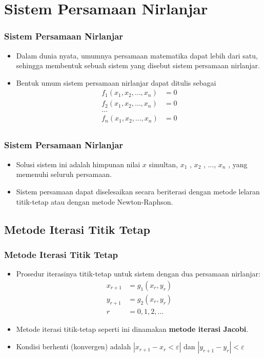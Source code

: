 \documentclass[pdflatex,compress]{beamer}
\begin{document}
\section{Sistem Persamaan Nirlanjar}

\begin{frame}
	\frametitle{Sistem Persamaan Nirlanjar}
	\begin{itemize}
		\item Dalam dunia nyata, umumnya persamaan matematika dapat lebih dari satu, sehingga membentuk sebuah sistem yang disebut sistem persamaan nirlanjar.
		\item Bentuk umum sistem persamaan nirlanjar dapat ditulis
		sebagai
		\begin{align*}
			f_1(x_1,x_2,\dots,x_n) &= 0 \\
			f_2(x_1,x_2,\dots,x_n) &= 0 \\
			\dots \\
			f_n(x_1,x_2,\dots,x_n) &= 0 \\
		\end{align*}
	\end{itemize}
\end{frame}

\begin{frame}
	\frametitle{Sistem Persamaan Nirlanjar}
	\begin{itemize}
		\item Solusi sistem ini adalah himpunan nilai $ x $ simultan, $ x_1 $ , $ x_2 $ , $\dots$, $ x_n $ , yang memenuhi seluruh persamaan.
		\item Sistem persamaan dapat diselesaikan secara beriterasi dengan metode lelaran titik-tetap atau dengan metode Newton-Raphson.
	\end{itemize}
\end{frame}

\subsection{Metode Iterasi Titik Tetap}

\begin{frame}
	\frametitle{Metode Iterasi Titik Tetap}
	\begin{itemize}
		\item Prosedur iterasinya titik-tetap untuk sistem dengan dua persamaan nirlanjar:
		\begin{align*}
			x_{r+1} &= g_1(x_r,y_r) \\
			y_{r+1} &= g_2(x_r,y_r) \\
			r &= 0,1,2,\dots
		\end{align*}
		\item Metode iterasi titik-tetap seperti ini dinamakan \textbf{metode iterasi Jacobi}.
		\item Kondisi berhenti (konvergen) adalah $ |x_{r+1} - x_r < \varepsilon| $ dan $ |y_{r+1} - y_r| < \varepsilon $
	\end{itemize}
\end{frame}
\end{document}

